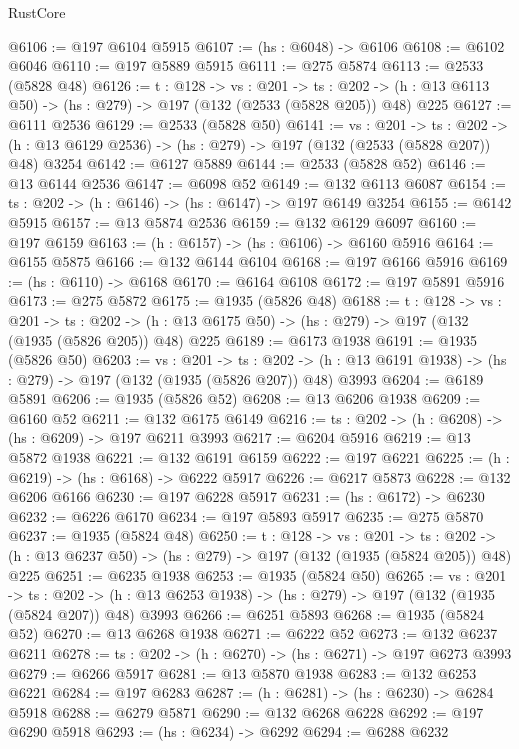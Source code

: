 \begin{lexlean}{RustCore}
\begin{coremodule}
@6106 := @197 @6104 @5915
@6107 := (hs : @6048) -> @6106
@6108 := @6102 @6046
@6110 := @197 @5889 @5915
@6111 := @275 @5874
@6113 := @2533 (@5828 @48)
@6126 := {t : @128} ->
  {vs : @201} ->
  {ts : @202} -> (h : @13 @6113 @50) -> (hs : @279) -> @197 (@132 (@2533 (@5828 @205)) @48) @225
@6127 := @6111 @2536
@6129 := @2533 (@5828 @50)
@6141 := {vs : @201} ->
  {ts : @202} -> (h : @13 @6129 @2536) -> (hs : @279) -> @197 (@132 (@2533 (@5828 @207)) @48) @3254
@6142 := @6127 @5889
@6144 := @2533 (@5828 @52)
@6146 := @13 @6144 @2536
@6147 := @6098 @52
@6149 := @132 @6113 @6087
@6154 := {ts : @202} -> (h : @6146) -> (hs : @6147) -> @197 @6149 @3254
@6155 := @6142 @5915
@6157 := @13 @5874 @2536
@6159 := @132 @6129 @6097
@6160 := @197 @6159
@6163 := (h : @6157) -> (hs : @6106) -> @6160 @5916
@6164 := @6155 @5875
@6166 := @132 @6144 @6104
@6168 := @197 @6166 @5916
@6169 := (hs : @6110) -> @6168
@6170 := @6164 @6108
@6172 := @197 @5891 @5916
@6173 := @275 @5872
@6175 := @1935 (@5826 @48)
@6188 := {t : @128} ->
  {vs : @201} ->
  {ts : @202} -> (h : @13 @6175 @50) -> (hs : @279) -> @197 (@132 (@1935 (@5826 @205)) @48) @225
@6189 := @6173 @1938
@6191 := @1935 (@5826 @50)
@6203 := {vs : @201} ->
  {ts : @202} -> (h : @13 @6191 @1938) -> (hs : @279) -> @197 (@132 (@1935 (@5826 @207)) @48) @3993
@6204 := @6189 @5891
@6206 := @1935 (@5826 @52)
@6208 := @13 @6206 @1938
@6209 := @6160 @52
@6211 := @132 @6175 @6149
@6216 := {ts : @202} -> (h : @6208) -> (hs : @6209) -> @197 @6211 @3993
@6217 := @6204 @5916
@6219 := @13 @5872 @1938
@6221 := @132 @6191 @6159
@6222 := @197 @6221
@6225 := (h : @6219) -> (hs : @6168) -> @6222 @5917
@6226 := @6217 @5873
@6228 := @132 @6206 @6166
@6230 := @197 @6228 @5917
@6231 := (hs : @6172) -> @6230
@6232 := @6226 @6170
@6234 := @197 @5893 @5917
@6235 := @275 @5870
@6237 := @1935 (@5824 @48)
@6250 := {t : @128} ->
  {vs : @201} ->
  {ts : @202} -> (h : @13 @6237 @50) -> (hs : @279) -> @197 (@132 (@1935 (@5824 @205)) @48) @225
@6251 := @6235 @1938
@6253 := @1935 (@5824 @50)
@6265 := {vs : @201} ->
  {ts : @202} -> (h : @13 @6253 @1938) -> (hs : @279) -> @197 (@132 (@1935 (@5824 @207)) @48) @3993
@6266 := @6251 @5893
@6268 := @1935 (@5824 @52)
@6270 := @13 @6268 @1938
@6271 := @6222 @52
@6273 := @132 @6237 @6211
@6278 := {ts : @202} -> (h : @6270) -> (hs : @6271) -> @197 @6273 @3993
@6279 := @6266 @5917
@6281 := @13 @5870 @1938
@6283 := @132 @6253 @6221
@6284 := @197 @6283
@6287 := (h : @6281) -> (hs : @6230) -> @6284 @5918
@6288 := @6279 @5871
@6290 := @132 @6268 @6228
@6292 := @197 @6290 @5918
@6293 := (hs : @6234) -> @6292
@6294 := @6288 @6232

\end{coremodule}
\end{lexlean}
